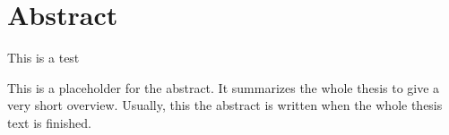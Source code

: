 \chapter*{Abstract}
\label{cha:abstract}

This is a test

This is a placeholder for the abstract. It summarizes the whole thesis
to give a very short overview. Usually, this the abstract is written
when the whole thesis text is finished.

